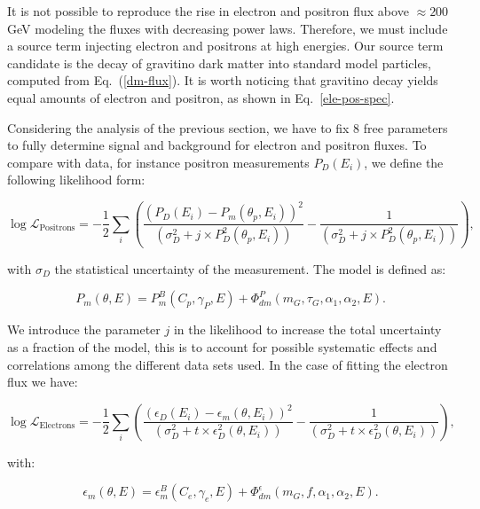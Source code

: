 \documentclass[a4paper,11pt]{article}
\begin{document}
It is not possible to reproduce the rise in electron and positron flux above $\approx 200$ GeV modeling the fluxes with decreasing power laws. Therefore, we must include a source term injecting electron and positrons at high energies. Our source term candidate is the decay of gravitino dark matter into standard model particles, computed from Eq.~(\ref{dm-flux}). It is worth noticing that gravitino decay yields equal amounts of electron and positron, as shown in Eq.~\ref{ele-pos-spec}. 

Considering the analysis of the previous section, we have to fix 8 free parameters to fully determine signal and background for electron and positron fluxes. To compare with data, for instance positron measurements $P_D(E_i)$, we define the following likelihood form:

\begin{equation}
\log  \mathcal{L}_{\text{Positrons}} = -\frac{1}{2} \sum_i{\left( \frac{(P_D(E_i) - P_m(\theta_p,E_i ))^2}{(\sigma_D^2 + j\times P_D^2(\theta_p,E_i))} - \frac{1}{(\sigma_D^2 + j\times P_D^2(\theta_p,E_i))}  \right) },
\end{equation}

\noindent with $\sigma_D$ the statistical uncertainty of the measurement. The model is defined as:

\begin{equation}
P_m(\theta,E ) = P_m^B(C_p, \gamma_P, E) + \Phi_{dm}^{P}(m_G, \tau_G, \alpha_1, \alpha_2, E).
\end{equation}

We introduce the parameter $j$ in the likelihood to increase the total uncertainty as a fraction of the model, this is to account for possible systematic effects and correlations among the different data sets used. In the case of fitting the electron flux we have:

\begin{equation}
\log  \mathcal{L}_{\text{Electrons}} = -\frac{1}{2} \sum_i{\left( \frac{(\epsilon_D(E_i) - \epsilon_m(\theta,E_i ))^2}{(\sigma_D^2 + t\times \epsilon_D^2(\theta,E_i))} - \frac{1}{(\sigma_D^2 + t\times \epsilon_D^2(\theta,E_i))}  \right) },
\end{equation}

\noindent with:

\begin{equation}
\epsilon_m(\theta,E ) = \epsilon_m^B(C_e, \gamma_e, E) + \Phi_{dm}^{\epsilon}(m_G, f, \alpha_1, \alpha_2, E).
\end{equation}
\end{document}

